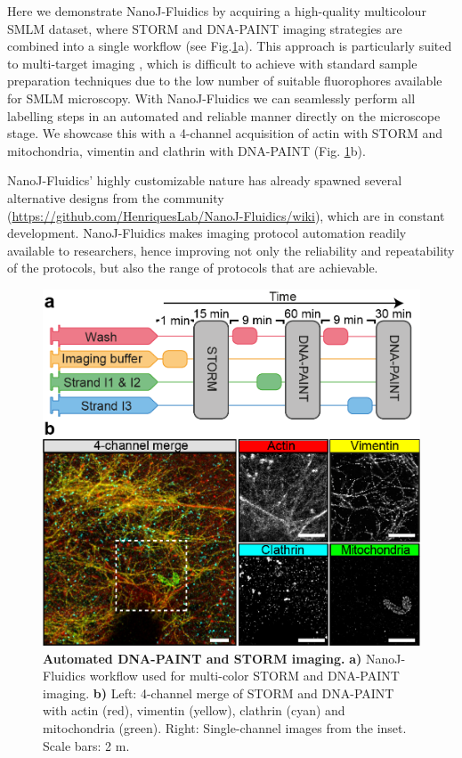  Here we demonstrate NanoJ-Fluidics by acquiring a high-quality multicolour SMLM dataset, where STORM and DNA-PAINT \cite{jungmann2014multiplexed} imaging strategies are combined into a single workflow (see Fig.\ref{fig:PAINT}a). This approach is particularly suited to multi-target imaging \cite{dempsey2011evaluation}, which is difficult to achieve with standard sample preparation techniques due to the low number of suitable fluorophores available for SMLM microscopy. With NanoJ-Fluidics we can seamlessly perform all labelling steps in an automated and reliable manner directly on the microscope stage. We showcase this with a 4-channel acquisition of actin with STORM and mitochondria, vimentin and clathrin with DNA-PAINT (Fig. \ref{fig:PAINT}b). 

 NanoJ-Fluidics' highly customizable nature has already spawned several alternative designs from the community (\href{https://github.com/HenriquesLab/NanoJ-Fluidics/wiki}{https://github.com/HenriquesLab/NanoJ-Fluidics/wiki}), which are in constant development. NanoJ-Fluidics makes imaging protocol automation readily available to researchers, hence improving not only the reliability and repeatability of the protocols, but also the range of protocols that are achievable.  

 \begin{figure}[!t]
    \centering
    \includegraphics{Figures/FigurePumpy_v3.png}
    \caption{\textbf{Automated DNA-PAINT and STORM imaging.} \textbf{a)} NanoJ-Fluidics workflow used for multi-color STORM and DNA-PAINT imaging. \textbf{b)} Left: 4-channel merge of STORM and DNA-PAINT with actin (red), vimentin (yellow), clathrin (cyan) and mitochondria (green). Right: Single-channel images from the inset. Scale bars: 2 \textmu{}m.}
    \label{fig:PAINT}
 \end{figure}

